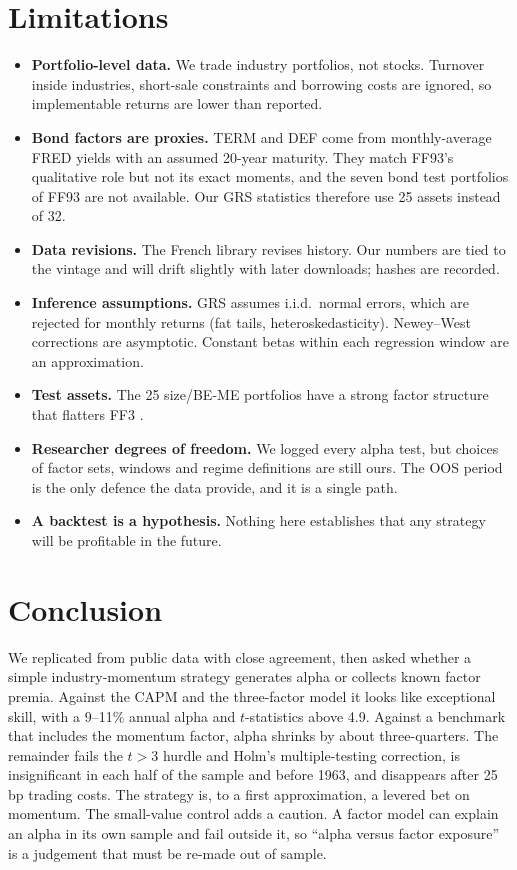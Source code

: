 \documentclass[11pt]{article}
\begin{document}
\section{Limitations}
\begin{itemize}
  \item \textbf{Portfolio-level data.} We trade industry portfolios, not stocks. Turnover inside industries, short-sale constraints and borrowing costs are ignored, so implementable returns are lower than reported.
  \item \textbf{Bond factors are proxies.} TERM and DEF come from monthly-average FRED yields with an assumed 20-year maturity. They match FF93's qualitative role but not its exact moments, and the seven bond test portfolios of FF93 are not available. Our GRS statistics therefore use 25 assets instead of 32.
  \item \textbf{Data revisions.} The French library revises history. Our numbers are tied to the \Vintage{} vintage and will drift slightly with later downloads; hashes are recorded.
  \item \textbf{Inference assumptions.} GRS assumes i.i.d.\ normal errors, which are rejected for monthly returns (fat tails, heteroskedasticity). Newey--West corrections are asymptotic. Constant betas within each regression window are an approximation.
  \item \textbf{Test assets.} The 25 size/BE-ME portfolios have a strong factor structure that flatters FF3 \citep{LNS2010}.
  \item \textbf{Researcher degrees of freedom.} We logged every alpha test, but choices of factor sets, windows and regime definitions are still ours. The OOS period is the only defence the data provide, and it is a single path.
  \item \textbf{A backtest is a hypothesis.} Nothing here establishes that any strategy will be profitable in the future.
\end{itemize}

\section{Conclusion}

We replicated \citet{FF1993} from public data with close agreement, then asked whether a simple industry-momentum strategy generates alpha or collects known factor premia. Against the CAPM and the three-factor model it looks like exceptional skill, with a 9--11\% annual alpha and $t$-statistics above 4.9. Against a benchmark that includes the momentum factor, alpha shrinks by about three-quarters. The remainder fails the $t>3$ hurdle and Holm's multiple-testing correction, is insignificant in each half of the sample and before 1963, and disappears after 25 bp trading costs. The strategy is, to a first approximation, a levered bet on momentum. The small-value control adds a caution. A factor model can explain an alpha in its own sample and fail outside it, so ``alpha versus factor exposure'' is a judgement that must be re-made out of sample.
\end{document}
